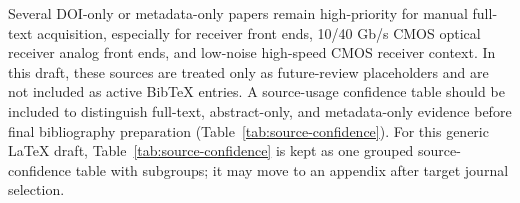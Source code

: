 Several DOI-only or metadata-only papers remain high-priority for manual full-text acquisition, especially for receiver front ends, 10/40 Gb/s CMOS optical receiver analog front ends, and low-noise high-speed CMOS receiver context. In this draft, these sources are treated only as future-review placeholders and are not included as active BibTeX entries. A source-usage confidence table should be included to distinguish full-text, abstract-only, and metadata-only evidence before final bibliography preparation (Table~\ref{tab:source-confidence}). For this generic LaTeX draft, Table~\ref{tab:source-confidence} is kept as one grouped source-confidence table with subgroups; it may move to an appendix after target journal selection.
